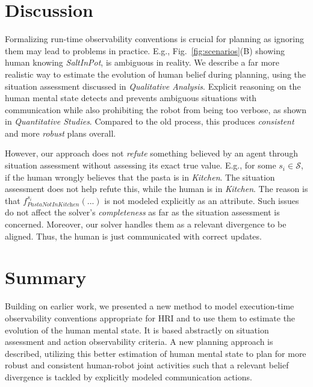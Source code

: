 \documentclass[letterpaper]{article} %
\begin{document}
\section{Discussion}
Formalizing run-time observability conventions is crucial for planning as ignoring them may lead to problems in practice. 
E.g., Fig.~\ref{fig:scenarios}(B) showing human knowing \textit{SaltInPot}, is ambiguous in reality. We describe a far more realistic way to estimate the evolution of human belief during planning, using the situation assessment discussed in \textit{Qualitative Analysis}. Explicit reasoning on the human mental state detects and prevents ambiguous situations with communication while also prohibiting the robot from being
too verbose,
as shown in \textit{Quantitative Studies}. 
Compared to the old process, this produces \textit{consistent} and more \textit{robust} plans overall.

However, our approach does not \textit{refute} something believed by an agent through situation assessment without assessing its exact true value. 
E.g., for some $s_i \in \mathcal{S}$, if the human 
wrongly believes that the pasta is in \textit{Kitchen}. The situation assessment does not help refute this, while the human is in \textit{Kitchen}. 
The reason is that $f_{\textit{PastaNotInKitchen}}^{s_i}(...)$ is not modeled explicitly as an attribute. 
Such issues do not affect the solver's \textit{completeness} as far as the situation assessment is concerned. Moreover, our solver handles them as a relevant divergence to be aligned. 
Thus, the human is just communicated with correct updates.

\section{Summary} 
Building on earlier work, we presented a new method to model execution-time observability conventions appropriate for HRI and to use them to estimate the evolution of the human mental state. It is based abstractly on situation assessment and action observability criteria. 
A new planning approach is described, utilizing this better estimation of human mental state to plan for more robust and consistent human-robot joint activities such that a relevant belief divergence is tackled by explicitly modeled communication actions. 
\end{document}
